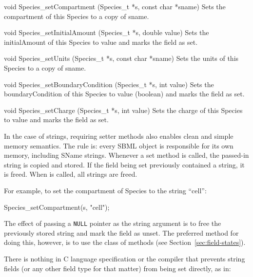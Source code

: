 \documentclass{cekmanual}
\begin{document}
\begin{methoddef}{void Species\_setCompartment (Species\_t *s,
const char *sname)}
  Sets the compartment of this Species to a copy of sname.
\end{methoddef}

\begin{methoddef}{void Species\_setInitialAmount (Species\_t *s, double value)}
  Sets the initialAmount of this Species to value and marks the
  field as set.
\end{methoddef}

\begin{methoddef}{void Species\_setUnits (Species\_t *s, const char *sname)}
  Sets the units of this Species to a copy of sname.
\end{methoddef}

\begin{methoddef}{void Species\_setBoundaryCondition (Species\_t *s, int value)}
  Sets the boundaryCondition of this Species to value (boolean) and marks
  the field as set.
\end{methoddef}

\begin{methoddef}{void Species\_setCharge (Species\_t *s, int value)}
  Sets the charge of this Species to value and marks the field as set.
\end{methoddef}


In the case of strings, requiring setter methods also enables clean
and simple memory semantics.  The rule is: every SBML object is
responsible for its own memory, including SName strings.  Whenever a
set method is called, the passed-in string is copied and stored.  If
the field being set previously contained a string, it is freed.  When
 is called, all strings are freed.

For example, to set the compartment of Species  to the
string ``cell'':

\begin{example}[c]
Species_setCompartment(s, "cell");
\end{example}

The effect of passing a \texttt{NULL} pointer as the string argument
is to free the previously stored string and mark the field as unset.
The preferred method for doing this, however, is to use the
 class of methods (see
Section~\ref{sec:field-states}).

There is nothing in C language specification or the compiler that
prevents string fields (or any other field type for that matter) from
being set directly, as in:
\end{document}
